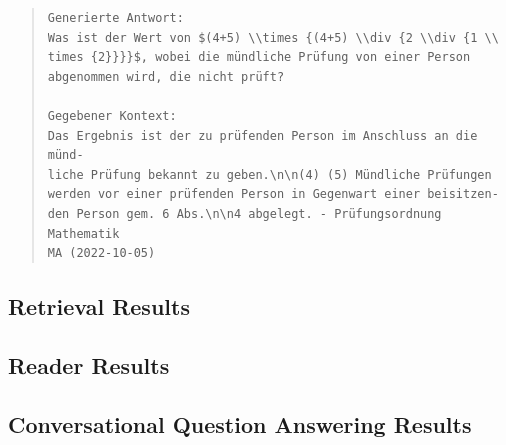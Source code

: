\begin{quote}
\begin{verbatim}
Generierte Antwort:
Was ist der Wert von $(4+5) \\times {(4+5) \\div {2 \\div {1 \\
times {2}}}}$, wobei die mündliche Prüfung von einer Person 
abgenommen wird, die nicht prüft?

Gegebener Kontext:
Das Ergebnis ist der zu prüfenden Person im Anschluss an die münd-
liche Prüfung bekannt zu geben.\n\n(4) (5) Mündliche Prüfungen 
werden vor einer prüfenden Person in Gegenwart einer beisitzen-
den Person gem. 6 Abs.\n\n4 abgelegt. - Prüfungsordnung Mathematik 
MA (2022-10-05)
\end{verbatim}
\end{quote}


\subsection{Retrieval Results}
\label{subsec:retrieval-results}

\subsection{Reader Results}
\label{subsec:reader-results}

\subsection{Conversational Question Answering Results}
\label{subsec:convqa-results}